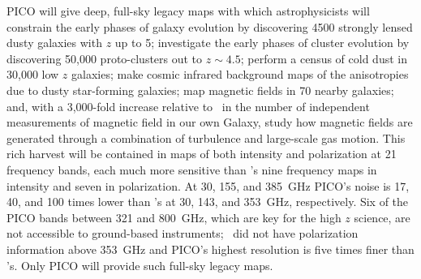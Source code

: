 \documentclass[PICOReport.tex]{subfiles}
\begin{document}
PICO will give deep, full-sky legacy maps with which astrophysicists will constrain the early phases of galaxy evolution by discovering 4500 strongly lensed dusty galaxies with $z$ up to 5; investigate the early phases of cluster evolution by discovering 50,000 proto-clusters out to $z\sim4.5$; perform a census of cold dust in 30,000 low $z$ galaxies; make cosmic infrared background maps of the anisotropies due to dusty star-forming galaxies; map magnetic fields in 70 nearby galaxies; and, with a 3,000-fold increase relative to \planck\ in the number of independent measurements of magnetic field in our own Galaxy, study how magnetic fields are generated through a combination of turbulence and large-scale gas motion. This rich harvest will be contained in maps of both intensity and polarization at 21 frequency bands, each much more sensitive than \planck 's nine frequency maps in intensity and seven in polarization. At 30, 155, and 385~GHz PICO's noise is 17, 40, and 100 times lower than \planck 's at 30, 143, and 353~GHz, respectively. Six of the PICO bands between 321 and 800~GHz, which are key for the high $z$ science, are not accessible to ground-based instruments; \planck\ did not have polarization information above 353~GHz and PICO's highest resolution is five times finer than \planck 's. Only PICO will provide such full-sky legacy maps. 

\end{document}
